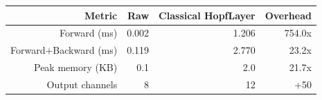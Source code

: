 \begin{tabular}{r r r r}
\toprule
Metric & Raw & Classical HopfLayer & Overhead \\
\midrule
Forward (ms) & 0.002 & 1.206 & 754.0x \\
Forward+Backward (ms) & 0.119 & 2.770 & 23.2x \\
Peak memory (KB) & 0.1 & 2.0 & 21.7x \\
Output channels & 8 & 12 & +50%
\bottomrule
\end{tabular}
